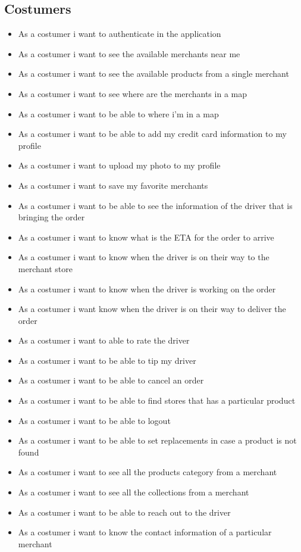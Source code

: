 \subsection{Costumers}
\begin{itemize}
    \item As a costumer i want to authenticate in the application
    \item As a costumer i want to see the available merchants near me
    \item As a costumer i want to see the available products from a single 
    merchant
    \item As a costumer i want to see where are the merchants in a map
    \item As a costumer i want to be able to where i’m in a map
    \item As a costumer i want to be able to add my credit card information 
    to my profile
    \item As a costumer i want to upload my photo to my profile
    \item As a costumer i want to save my favorite merchants
    \item As a costumer i want to be able to see the information of the driver 
    that is bringing the order
    \item As a costumer i want to know what is the ETA for the order to arrive
    \item As a costumer i want to know when the driver is on their way to the 
    merchant store
    \item As a costumer i want to know when the driver is working on the order
    \item As a costumer i want know when the driver is on their way to deliver 
    the order
    \item As a costumer i want to able to rate the driver
    \item As a costumer i want to be able to tip my driver
    \item As a costumer i want to be able to cancel an order
    \item As a costumer i want to be able to find stores that has a particular 
    product
    \item As a costumer i want to be able to logout
    \item As a costumer i want to be able to set replacements in case a 
    product is not found
    \item As a costumer i want to see all the products category from a merchant
    \item As a costumer i want to see all the collections from a merchant
    \item As a costumer i want to be able to reach out to the driver
    \item As a costumer i want to know the contact information of a 
    particular merchant
\end{itemize}
